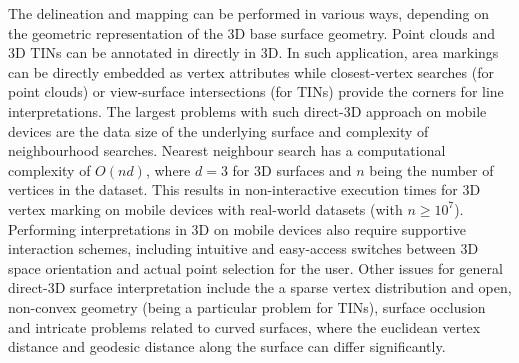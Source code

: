 \documentclass[review]{elsarticle}
\begin{document}
The delineation and mapping can be performed in various ways, depending on the geometric representation of the 3D base surface geometry. Point clouds and 3D \glspl{TIN} can be annotated in directly in 3D. In such application, area markings can be directly embedded as vertex attributes while closest-vertex searches (for point clouds) or view-surface intersections (for \glspl{TIN}) provide the corners for line interpretations. The largest problems with such direct-3D approach on mobile devices are the data size of the underlying surface and complexity of neighbourhood searches. Nearest neighbour search has a computational complexity of $O(nd)$, where $d=3$ for 3D surfaces and $n$ being the number of vertices in the dataset. This results in non-interactive execution times for 3D vertex marking on mobile devices with real-world datasets (with $n \geq 10^7$). Performing interpretations in 3D on mobile devices also require supportive interaction schemes, including intuitive and easy-access switches between 3D space orientation and actual point selection for the user. Other issues for general direct-3D surface interpretation include the a sparse vertex distribution and open, non-convex geometry (being a particular problem for \glspl{TIN}), surface occlusion and intricate problems related to curved surfaces, where the euclidean vertex distance and geodesic distance along the surface can differ significantly. 

\end{document}
